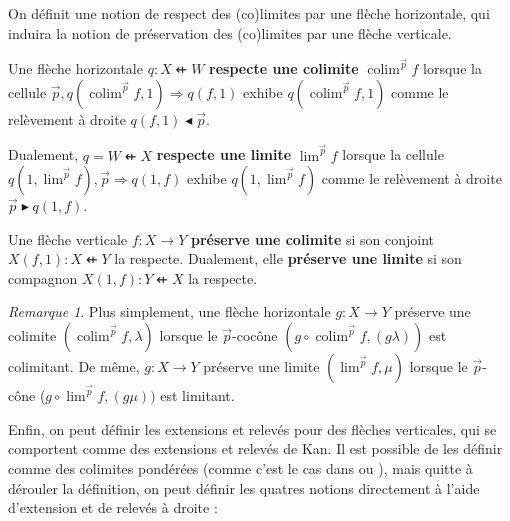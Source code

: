\documentclass[8pt,a4paper,french,draft]{article}
\newcommand{\To}{\Rightarrow}
\newcommand{\dfrom}{\nvleftarrow}
\newcommand{\rift}{\mathbin{\blacktriangleleft}}
\newcommand{\rext}{\mathbin{\blacktriangleright}}
\DeclareMathOperator{\colim}{colim}
\theoremstyle{plain}
\theoremstyle{definition}
\theoremstyle{remark}
\newtheorem{remark}[theorem]{Remarque}
\begin{document}
On définit une notion de respect des (co)limites par une flèche horizontale, qui induira la notion de préservation des (co)limites par une flèche verticale.

\begin{definition}
    Une flèche horizontale $q : X \dfrom W$ \textbf{respecte une colimite} $\colim^{\vec{p}}f$ lorsque la cellule $\vec{p}, q(\colim^{\vec{p}}f, 1) \To q(f, 1)$ exhibe $q(\colim^{\vec{p}}f, 1)$ comme le relèvement à droite $q(f, 1) \rift \vec{p}$.

    \noindent
    Dualement, $q = W \dfrom X$ \textbf{respecte une limite} $\lim^{\vec{p}}f$ lorsque la cellule $q(1, \lim^{\vec{p}}f), \vec{p} \To q(1, f)$ exhibe $q(1, \lim^{\vec{p}}f)$ comme le relèvement à droite $\vec{p} \rext q(1, f)$.
\end{definition}

\begin{definition}
    Une flèche verticale $f : X \to Y$ \textbf{préserve une colimite} si son conjoint $X(f, 1) : X \dfrom Y$ la respecte. Dualement, elle \textbf{préserve une limite} si son compagnon $X(1, f) : Y \dfrom X$ la respecte.
\end{definition}

\begin{remark}
    Plus simplement, une flèche horizontale $g : X \to Y$ préserve une colimite $(\colim^{\vec{p}}f, \lambda)$ lorsque le $\vec{p}$-cocône $(g\circ\colim^{\vec{p}}f, (g\lambda))$ est colimitant. De même, $g : X \to Y$ préserve une limite $(\lim^{\vec{p}}f, \mu)$ lorsque le $\vec{p}$-cône ($g\circ\lim^{\vec{p}}f, (g\mu))$ est limitant.
\end{remark}

Enfin, on peut définir les extensions et relevés pour des flèches verticales, qui se comportent comme des extensions et relevés de Kan. Il est possible de les définir comme des colimites pondérées (comme c'est le cas dans \cite[Chapter 4]{kelly} ou \cite[Remark 4.1.13]{coend_calculus}), mais quitte à dérouler la définition, on peut définir les quatres notions directement à l'aide d'extension et de relevés à droite :
\end{document}
